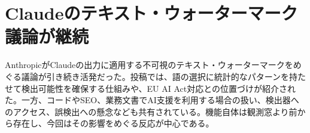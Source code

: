 \section{Claudeのテキスト・ウォーターマーク議論が継続}
AnthropicがClaudeの出力に適用する不可視のテキスト・ウォーターマークをめぐる議論が引き続き活発だった。投稿では、語の選択に統計的なパターンを持たせて検出可能性を確保する仕組みや、EU AI Act対応との位置づけが紹介された。一方、コードやSEO、業務文書でAI支援を利用する場合の扱い、検出器へのアクセス、誤検出への懸念なども共有されている。機能自体は観測窓より前から存在し、今回はその影響をめぐる反応が中心である。

